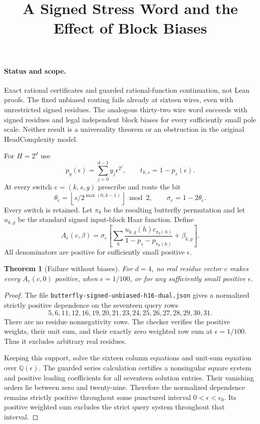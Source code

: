 \documentclass[11pt]{article}
\title{A Signed Stress Word and the Effect of Block Biases}
\author{}\date{}
\newtheorem{theorem}{Theorem}
\begin{document}
\maketitle
\paragraph{Status and scope.}
Exact rational certificates and guarded rational-function continuation,
not Lean proofs. The fixed unbiased routing fails already at sixteen
wires, even with unrestricted signed residues. The analogous thirty-two
wire word succeeds with signed residues and legal independent block
biases for every sufficiently small pole scale. Neither result is a
universality theorem or an obstruction in the original HeadComplexity
model.

For $H=2^d$ use
\[
 p_y(\epsilon)=\sum_{j=0}^{d-1}y_j\epsilon^{2^j},\qquad
 t_{k,s}=1-p_s(\epsilon).
\]
At every switch $e=(k,s,g)$ prescribe and route the bit
\[
 \theta_e=\left\lfloor s/2^{\max(0,k-1)}\right\rfloor\bmod2,
 \qquad \sigma_e=1-2\theta_e.
\]
Every switch is retained. Let $\pi_\theta$ be the resulting butterfly
permutation and let $u_{k,g}$ be the standard signed input-block Haar
function. Define
\[
 A_e(c,\beta)=\sigma_e\left[
 \sum_h\frac{u_{k,g}(h)c_{\pi_\theta(h)}}
 {1-p_s-p_{\pi_\theta(h)}}+\beta_{k,g}\right].
\]
All denominators are positive for sufficiently small positive $\epsilon$.

\begin{theorem}[Failure without biases]
For $d=4$, no real residue vector $c$ makes every $A_e(c,0)$ positive,
when $\epsilon=1/100$, or for any sufficiently small positive $\epsilon$.
\end{theorem}
\begin{proof}
The file \texttt{butterfly-signed-unbiased-h16-dual.json} gives a
normalized strictly positive dependence on the seventeen query rows
\[
 5,6,11,12,16,19,20,21,23,24,25,26,27,28,29,30,31.
\]
There are no residue nonnegativity rows. The checker verifies the
positive weights, their unit sum, and their exactly zero weighted row
sum at $\epsilon=1/100$. Thus it excludes arbitrary real residues.

Keeping this support, solve the sixteen column equations and unit-sum
equation over $\mathbb Q(\epsilon)$. The guarded series calculation
certifies a nonsingular square system and positive leading coefficients
for all seventeen solution entries. Their vanishing orders lie between
zero and twenty-nine. Therefore the normalized dependence remains
strictly positive throughout some punctured interval
$0<\epsilon<\epsilon_0$. Its positive weighted sum excludes the strict
query system throughout that interval.
\end{proof}
\end{document}
